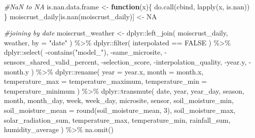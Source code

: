 \documentclass[
  table]{article}
\newenvironment{Shaded}{\begin{snugshade}}{\end{snugshade}}
\newcommand{\AttributeTok}[1]{\textcolor[rgb]{0.77,0.63,0.00}{#1}}
\newcommand{\CommentTok}[1]{\textcolor[rgb]{0.56,0.35,0.01}{\textit{#1}}}
\newcommand{\ConstantTok}[1]{\textcolor[rgb]{0.00,0.00,0.00}{#1}}
\newcommand{\ControlFlowTok}[1]{\textcolor[rgb]{0.13,0.29,0.53}{\textbf{#1}}}
\newcommand{\DecValTok}[1]{\textcolor[rgb]{0.00,0.00,0.81}{#1}}
\newcommand{\FunctionTok}[1]{\textcolor[rgb]{0.00,0.00,0.00}{#1}}
\newcommand{\NormalTok}[1]{#1}
\newcommand{\OtherTok}[1]{\textcolor[rgb]{0.56,0.35,0.01}{#1}}
\newcommand{\SpecialCharTok}[1]{\textcolor[rgb]{0.00,0.00,0.00}{#1}}
\newcommand{\StringTok}[1]{\textcolor[rgb]{0.31,0.60,0.02}{#1}}
\begin{document}
\begin{Shaded}
\begin{Highlighting}[]
\CommentTok{\#NaN to NA}
\NormalTok{is.nan.data.frame }\OtherTok{\textless{}{-}} \ControlFlowTok{function}\NormalTok{(x)\{}
  \FunctionTok{do.call}\NormalTok{(cbind, }\FunctionTok{lapply}\NormalTok{(x, is.nan))}
\NormalTok{\}}
\NormalTok{moiscrust\_daily[}\FunctionTok{is.nan}\NormalTok{(moiscrust\_daily)] }\OtherTok{\textless{}{-}} \ConstantTok{NA}

\CommentTok{\#joining by date}
\NormalTok{moiscrust\_weather }\OtherTok{\textless{}{-}}\NormalTok{ dplyr}\SpecialCharTok{::}\FunctionTok{left\_join}\NormalTok{(}
\NormalTok{  moiscrust\_daily,}
\NormalTok{  weather,}
  \AttributeTok{by =} \StringTok{"date"}
\NormalTok{) }\SpecialCharTok{\%\textgreater{}\%}\NormalTok{ dplyr}\SpecialCharTok{::}\FunctionTok{filter}\NormalTok{(}
\NormalTok{  interpolated }\SpecialCharTok{==} \ConstantTok{FALSE}
\NormalTok{) }\SpecialCharTok{\%\textgreater{}\%} 
\NormalTok{  dplyr}\SpecialCharTok{::}\FunctionTok{select}\NormalTok{(}
    \SpecialCharTok{{-}}\FunctionTok{contains}\NormalTok{(}\StringTok{"model\_"}\NormalTok{),}
    \SpecialCharTok{{-}}\NormalTok{same\_microsite,}
    \SpecialCharTok{{-}}\NormalTok{sensors\_shared\_valid\_percent,}
    \SpecialCharTok{{-}}\NormalTok{selection\_score,}
    \SpecialCharTok{{-}}\NormalTok{interpolation\_quality,}
    \SpecialCharTok{{-}}\NormalTok{year.y,}
    \SpecialCharTok{{-}}\NormalTok{month.y}
\NormalTok{    ) }\SpecialCharTok{\%\textgreater{}\%} 
\NormalTok{  dplyr}\SpecialCharTok{::}\FunctionTok{rename}\NormalTok{(}
    \AttributeTok{year =}\NormalTok{ year.x,}
    \AttributeTok{month =}\NormalTok{ month.x,}
    \AttributeTok{temperature\_max =}\NormalTok{ temperature\_maximum,}
    \AttributeTok{temperature\_min =}\NormalTok{ temperature\_minimum}
\NormalTok{  ) }\SpecialCharTok{\%\textgreater{}\%} 
\NormalTok{  dplyr}\SpecialCharTok{::}\FunctionTok{transmute}\NormalTok{(}
\NormalTok{    date,}
\NormalTok{    year,}
\NormalTok{    year\_day,}
\NormalTok{    season,}
\NormalTok{    month,}
\NormalTok{    month\_day,}
\NormalTok{    week,}
\NormalTok{    week\_day,}
\NormalTok{    microsite,}
\NormalTok{    sensor,}
\NormalTok{    soil\_moisture\_min,}
    \AttributeTok{soil\_moisture\_mean =} \FunctionTok{round}\NormalTok{(soil\_moisture\_mean, }\DecValTok{3}\NormalTok{),}
\NormalTok{    soil\_moisture\_max,}
\NormalTok{    solar\_radiation\_sum,}
\NormalTok{    temperature\_max,}
\NormalTok{    temperature\_min,}
\NormalTok{    rainfall\_sum,}
\NormalTok{    humidity\_average}
\NormalTok{  ) }\SpecialCharTok{\%\textgreater{}\%} 
  \FunctionTok{na.omit}\NormalTok{()}
\end{Highlighting}
\end{Shaded}
\end{document}
